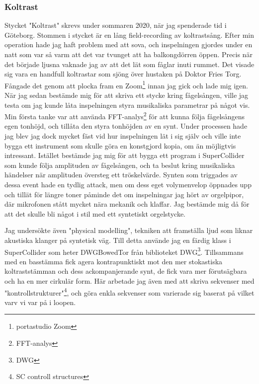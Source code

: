 \documentclass{article}
\begin{document}
	\subsubsection{Koltrast}
	Stycket "Koltrast" skrevs under sommaren 2020, när jag spenderade tid i Göteborg. Stommen i stycket är en
	lång field-recording av koltrastsång. Efter min operation hade jag haft problem med att sova, och
	inspelningen gjordes under en natt som var så varm att det var tvunget att ha balkongdörren öppen. Precis
	när det började ljusna vaknade jag av att det lät som fåglar inuti rummet. Det visade sig vara en handfull
	koltrastar som sjöng över hustaken på Doktor Fries Torg. Fångade det genom att plocka fram en
	Zoom\footnote{portastudio Zoom} innan jag gick och lade mig igen. 
		När jag sedan bestämde mig för att skriva ett stycke kring fågelsången, ville jag testa om jag kunde
	låta inspelningen styra musikaliska parametrar på något vis. Min första tanke var att använda
	FFT-analys\footnote{FFT-analys} för att kunna följa fågelsångens egen tonhöjd, och tillåta den styra
	tonhöjden av en synt. Under processen hade jag blev jag dock mycket fäst vid hur inspelningen lät i sig
	själv och ville inte bygga ett instrument som skulle göra en konstgjord kopia, om än möjligtvis
	intressant. Istället bestämde jag mig för att bygga ett program i SuperCollider som kunde följa amplituden
	av fågelsången, och ta beslut kring musikaliska händelser när amplituden översteg ett tröskelvärde. Synten
	som triggades av dessa event hade en tydlig attack, men om dess eget volymenvelop öppnades upp och tillät
	för längre toner påminde det om inspelningar jag hört av orgelpipor, där mikrofonen stått mycket nära
	mekanik och klaffar. Jag bestämde mig då för att det skulle bli något i stil med ett syntetiskt
	orgelstycke. 


	Jag undersökte även "physical modelling", tekniken att framställa ljud som liknar akustiska klanger på
	syntetisk väg. Till detta använde jag en färdig klass i SuperCollider som heter DWGBowedTor från
	biblioteket DWG\footnote{DWG}. Tillsammans med en basstämma fick agera kontrapunktiskt mot den mer
	stokastiska koltraststämman och dess ackompanjerande synt, de fick vara mer förutsägbara och ha en mer
	cirkulär form. Här arbetade jag även med att skriva sekvenser med "kontrollstrukturer"\footnote{SC
	controll structures}, och göra enkla sekvenser som varierade sig baserat på vilket varv vi var på i
	loopen. 
\end{document}
